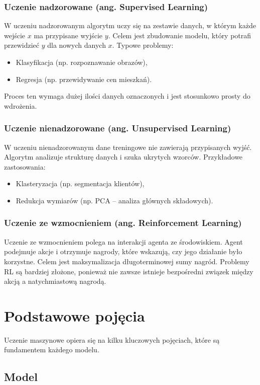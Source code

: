 \subsubsection{Uczenie nadzorowane (ang. Supervised Learning)}
W uczeniu nadzorowanym algorytm uczy się na zestawie danych, w którym każde wejście \( x \) ma przypisane wyjście \( y \). Celem jest zbudowanie modelu, który potrafi przewidzieć \( y \) dla nowych danych \( x \). Typowe problemy:
\begin{itemize}
	\item Klasyfikacja (np. rozpoznawanie obrazów),
	\item Regresja (np. przewidywanie cen mieszkań).
\end{itemize}
Proces ten wymaga dużej ilości danych oznaczonych i jest stosunkowo prosty do wdrożenia.

\subsubsection{Uczenie nienadzorowane (ang. Unsupervised Learning)}
W uczeniu nienadzorowanym dane treningowe nie zawierają przypisanych wyjść. Algorytm analizuje strukturę danych i szuka ukrytych wzorców. Przykładowe zastosowania:
\begin{itemize}
	\item Klasteryzacja (np. segmentacja klientów),
	\item Redukcja wymiarów (np. PCA – analiza głównych składowych).
\end{itemize}

\subsubsection{Uczenie ze wzmocnieniem (ang. Reinforcement Learning)}
Uczenie ze wzmocnieniem polega na interakcji agenta ze środowiskiem. Agent podejmuje akcje i otrzymuje nagrody, które wskazują, czy jego działanie było korzystne. Celem jest maksymalizacja długoterminowej sumy nagród. Problemy RL są bardziej złożone, ponieważ nie zawsze istnieje bezpośredni związek między akcją a natychmiastową nagrodą.

\section{Podstawowe pojęcia}

Uczenie maszynowe opiera się na kilku kluczowych pojęciach, które są fundamentem każdego modelu.

\subsection{Model}

